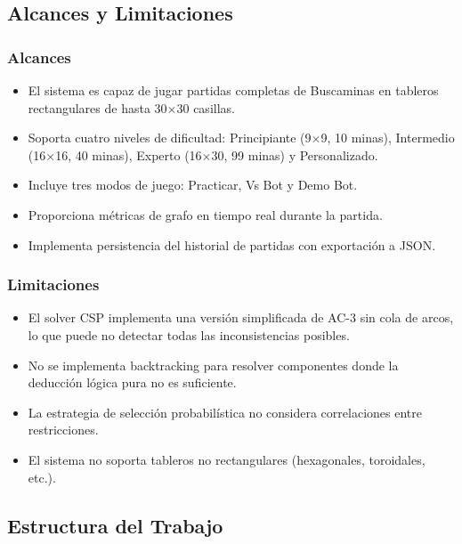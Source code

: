 \documentclass[12pt,a4paper]{article}
\begin{document}
\subsection{Alcances y Limitaciones}

\subsubsection{Alcances}

\begin{itemize}[itemsep=2pt]
    \item El sistema es capaz de jugar partidas completas de Buscaminas en tableros rectangulares de hasta 30$\times$30 casillas.
    \item Soporta cuatro niveles de dificultad: Principiante (9$\times$9, 10 minas), Intermedio (16$\times$16, 40 minas), Experto (16$\times$30, 99 minas) y Personalizado.
    \item Incluye tres modos de juego: Practicar, Vs Bot y Demo Bot.
    \item Proporciona métricas de grafo en tiempo real durante la partida.
    \item Implementa persistencia del historial de partidas con exportación a JSON.
\end{itemize}

\subsubsection{Limitaciones}

\begin{itemize}[itemsep=2pt]
    \item El solver CSP implementa una versión simplificada de AC-3 sin cola de arcos, lo que puede no detectar todas las inconsistencias posibles.
    \item No se implementa backtracking para resolver componentes donde la deducción lógica pura no es suficiente.
    \item La estrategia de selección probabilística no considera correlaciones entre restricciones.
    \item El sistema no soporta tableros no rectangulares (hexagonales, toroidales, etc.).
\end{itemize}

\subsection{Estructura del Trabajo}
\end{document}
